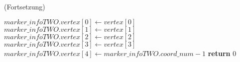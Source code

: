 \begin{algorithm}[!ht]
\caption{ (Fortsetzung)}
\label{alg:checksquare-7}
\begin{algorithmic}[1]
	\State $\mathit{marker\_infoTWO.vertex}[0] \gets \mathit{vertex}[0]$
	\label{alg:checksquare-7-savesxsy}
	\State $\mathit{marker\_infoTWO.vertex}[1] \gets \mathit{vertex}[1]$
	\label{alg:checksquare-7-save1}
	\State $\mathit{marker\_infoTWO.vertex}[2] \gets \mathit{vertex}[2]$
	\State $\mathit{marker\_infoTWO.vertex}[3] \gets \mathit{vertex}[3]$
	\label{alg:checksquare-7-save3}
	\State $\mathit{marker\_infoTWO.vertex}[4] \gets \mathit{marker\_infoTWO.coord\_num} - 1$
	\label{alg:checksquare-7-savelast}
	\State \textbf{return} $0$
\end{algorithmic}
\end{algorithm}
